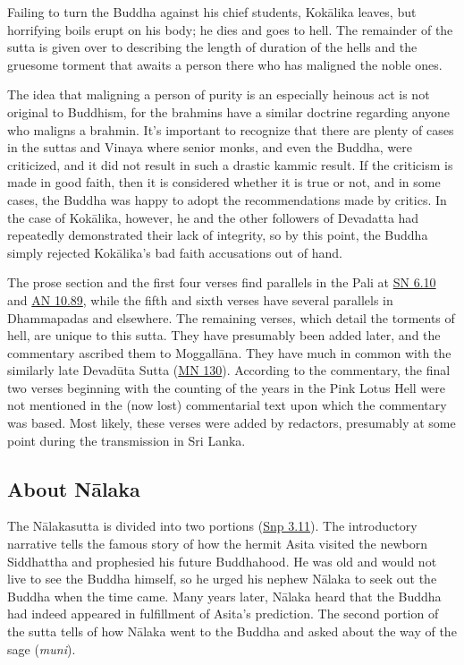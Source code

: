 \documentclass[12pt,openany]{book}%
\begin{document}
Failing to turn the Buddha against his chief students, \textsanskrit{Kokālika} leaves, but horrifying boils erupt on his body; he dies and goes to hell. The remainder of the sutta is given over to describing the length of duration of the hells and the gruesome torment that awaits a person there who has maligned the noble ones.

The idea that maligning a person of purity is an especially heinous act is not original to Buddhism, for the brahmins have a similar doctrine regarding anyone who maligns a brahmin. It’s important to recognize that there are plenty of cases in the suttas and Vinaya where senior monks, and even the Buddha, were criticized, and it did not result in such a drastic kammic result. If the criticism is made in good faith, then it is considered whether it is true or not, and in some cases, the Buddha was happy to adopt the recommendations made by critics. In the case of \textsanskrit{Kokālika}, however, he and the other followers of Devadatta had repeatedly demonstrated their lack of integrity, so by this point, the Buddha simply rejected \textsanskrit{Kokālika}’s bad faith accusations out of hand.

The prose section and the first four verses find parallels in the Pali at \href{https://suttacentral.net/sn6.10/en/sujato}{SN 6.10} and \href{https://suttacentral.net/an10.89/en/sujato}{AN 10.89}, while the fifth and sixth verses have several parallels in Dhammapadas and elsewhere. The remaining verses, which detail the torments of hell, are unique to this sutta. They have presumably been added later, and the commentary ascribed them to \textsanskrit{Moggallāna}. They have much in common with the similarly late \textsanskrit{Devadūta} Sutta (\href{https://suttacentral.net/mn130/en/sujato}{MN 130}). According to the commentary, the final two verses beginning with the counting of the years in the Pink Lotus Hell were not mentioned in the (now lost) commentarial text upon which the commentary was based. Most likely, these verses were added by redactors, presumably at some point during the transmission in Sri Lanka.

\subsection*{About \textsanskrit{Nālaka}}

The \textsanskrit{Nālakasutta} is divided into two portions (\href{https://suttacentral.net/snp3.11/en/sujato}{Snp 3.11}). The introductory narrative tells the famous story of how the hermit Asita visited the newborn Siddhattha and prophesied his future Buddhahood. He was old and would not live to see the Buddha himself, so he urged his nephew \textsanskrit{Nālaka} to seek out the Buddha when the time came. Many years later, \textsanskrit{Nālaka} heard that the Buddha had indeed appeared in fulfillment of Asita’s prediction. The second portion of the sutta tells of how \textsanskrit{Nālaka} went to the Buddha and asked about the way of the sage (\textit{muni}).
\end{document}
